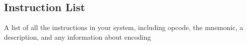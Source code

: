 \documentclass{article}
\begin{document}
\clearpage
\begin{landscape}
\section{Instruction List}
	A list of all the instructions in your system, including opcode, the mnemonic, a description, and any information about encoding


\end{landscape}
\end{document}
